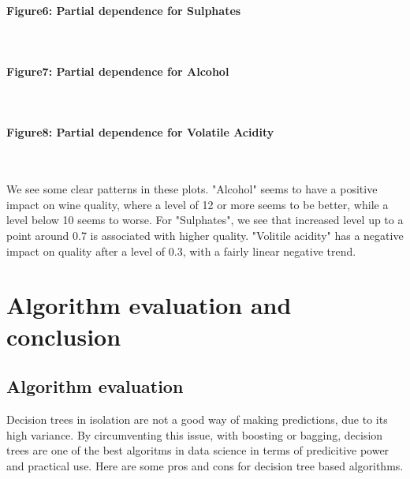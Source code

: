 \documentclass[10pt, a4paper, twocolumn]{article}
\newcommand{\myparagraph}[1]{\paragraph{#1}\mbox{}\\}
\begin{document}
			\myparagraph{Figure6: Partial dependence for Sulphates}
			\myparagraph{Figure7: Partial dependence for Alcohol}
			\myparagraph{Figure8: Partial dependence for Volatile Acidity}
			
			We see some clear patterns in these plots. "Alcohol" seems to have a positive impact on wine quality, where a level of 12 or more seems to be better, while a level below 10 seems to worse. For "Sulphates", we see that increased level up to a point around 0.7 is associated with higher quality. "Volitile acidity" has a negative impact on quality after a level of 0.3, with a fairly linear negative trend.
			
\section{Algorithm evaluation and conclusion}
	\subsection{Algorithm evaluation}
	Decision trees in isolation are not a good way of making predictions, due to its high variance. By circumventing this issue, with boosting or bagging, decision trees are one of the best algoritms in data science in terms of predicitive power and practical use. Here are some pros and cons for decision tree based algorithms.
	
\end{document}
